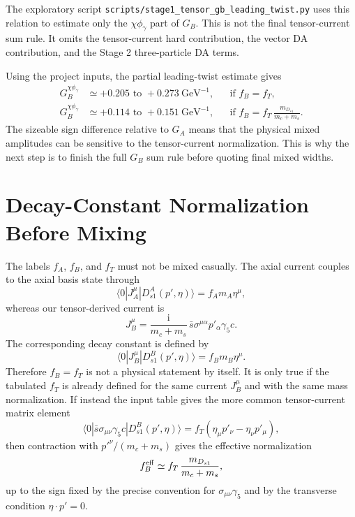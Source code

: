 \documentclass[11pt]{article}
\newcommand{\ii}{\mathrm{i}}
\begin{document}
The exploratory script
\texttt{scripts/stage1\_tensor\_gb\_leading\_twist.py} uses this relation to
estimate only the $\chi\phi_\gamma$ part of $G_B$.  This is not the final
tensor-current sum rule.  It omits the tensor-current hard contribution, the
vector DA contribution, and the Stage 2 three-particle DA terms.

Using the project inputs, the partial leading-twist estimate gives
\begin{align}
  G_B^{\chi\phi_\gamma}
  &\simeq +0.205\text{ to }+0.273\ \mathrm{GeV}^{-1},
  &&\text{if } f_B=f_T,\\
  G_B^{\chi\phi_\gamma}
  &\simeq +0.114\text{ to }+0.151\ \mathrm{GeV}^{-1},
  &&\text{if } f_B=f_T\,\frac{m_{D_{s1}}}{m_c+m_s}.
\end{align}
The sizeable sign difference relative to $G_A$ means that the physical mixed
amplitudes can be sensitive to the tensor-current normalization.  This is why
the next step is to finish the full $G_B$ sum rule before quoting final mixed
widths.

\section{Decay-Constant Normalization Before Mixing}

The labels $f_A$, $f_B$, and $f_T$ must not be mixed casually.  The axial
current couples to the axial basis state through
\begin{equation}
  \langle 0|J_A^\mu|D_{s1}^{A}(p',\eta)\rangle
  =
  f_A m_A \eta^\mu ,
\end{equation}
whereas our tensor-derived current is
\begin{equation}
  J_B^\mu
  =
  \frac{\ii}{m_c+m_s}\,
  \bar s\sigma^{\mu\alpha}p'_\alpha\gamma_5 c .
\end{equation}
The corresponding decay constant is defined by
\begin{equation}
  \langle 0|J_B^\mu|D_{s1}^{B}(p',\eta)\rangle
  =
  f_B m_B \eta^\mu .
\end{equation}
Therefore $f_B=f_T$ is not a physical statement by itself.  It is only true if
the tabulated $f_T$ is already defined for the same current $J_B^\mu$ and with
the same mass normalization.  If instead the input table gives the more common
tensor-current matrix element
\begin{equation}
  \langle 0|\bar s\sigma_{\mu\nu}\gamma_5 c|D_{s1}^{B}(p',\eta)\rangle
  =
  f_T(\eta_\mu p'_\nu-\eta_\nu p'_\mu),
\end{equation}
then contraction with $p'^\nu/(m_c+m_s)$ gives the effective normalization
\begin{equation}
  f_B^{\rm eff}
  \simeq
  f_T\,\frac{m_{D_{s1}}}{m_c+m_s},
\end{equation}
up to the sign fixed by the precise convention for
$\sigma_{\mu\nu}\gamma_5$ and by the transverse condition $\eta\cdot p'=0$.
\end{document}
